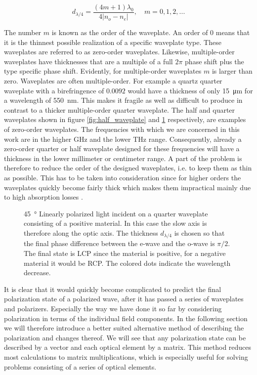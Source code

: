 \begin{equation}
    \label{eq:thickness_quarter_waveplate}
    d_{\lambda/4} = \frac{(4m+1)\lambda_0}{4|n_o - n_e|}, \quad m=0,1,2,... 
\end{equation}

The number $m$ is known as the order of the waveplate. An order of $0$ means that it is the thinnest possible realization of a specific waveplate type. These waveplates are referred to as zero-order waveplates. Likewise, multiple-order waveplates have thicknesses that are a multiple of a full $2\pi$ phase shift plus the type specific phase shift. Evidently, for multiple-order waveplates $m$ is larger than zero. Waveplates are often multiple-order. For example a quartz quarter waveplate with a birefringence of $0.0092$ would have a thickness of only \SI{15}{\micro \meter} for a wavelength of \SI{550}{\nano \meter}. This makes it fragile as well as difficult to produce in contrast to a thicker multiple-order quarter waveplate. The half and quarter waveplates shown in figure \ref{fig:half_waveplate} and \ref{fig:quarter_waveplate} respectively, are examples of zero-order waveplates. The frequencies with which we are concerned in this work are in the higher GHz and the lower THz range. Consequently, already a zero-order quarter or half waveplate designed for these frequencies will have a thickness in the lower millimeter or centimeter range. A part of the problem is therefore to reduce the order of the designed waveplates, i.e. to keep them as thin as possible. This has to be taken into consideration since for higher orders the waveplates quickly become fairly thick which makes them impractical mainly due to high absorption losses \cite{Hecht}.

\begin{figure}[h]
    \centering
    
    \caption{\SI{45}{\degree} Linearly polarized light incident on a quarter waveplate consisting of a positive material. In this case the slow axis is therefore along the optic axis. The thickness $d_{\lambda/4}$ is chosen so that the final phase difference between the e-wave and the o-wave is $\pi/2$. The final state is LCP since the material is positive, for a negative material it would be RCP. The colored dots indicate the wavelength decrease.}
    \label{fig:quarter_waveplate}
\end{figure}

It is clear that it would quickly become complicated to predict the final polarization state of a polarized wave, after it has passed a series of waveplates and polarizers. Especially the way we have done it so far by considering polarization in terms of the individual field components. In the following section we will therefore introduce a better suited alternative method of describing the polarization and changes thereof. We will see that any polarization state can be described by a vector and each optical element by a matrix. This method reduces most calculations to matrix multiplications, which is especially useful for solving problems consisting of a series of optical elements.

